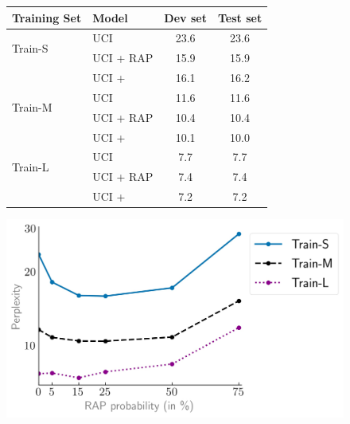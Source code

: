 

\begin{figure}
	\begin{minipage}{\textwidth}
		\begin{minipage}[b]{0.48\textwidth}
			\centering
			\begin{tabular}{llcc}
				\toprule
				Training Set & Model   & Dev set & Test set \\
				\midrule
				\multirow{2}{*}{Train-S} 
				& UCI 				& 23.6 & 23.6\\
				& UCI + RAP 		& 15.9 & 15.9\\
				& UCI + \piecetype 	& 16.1 & 16.2 \\
				\midrule
				\multirow{2}{*}{Train-M} 
				& UCI 				& 11.6 & 11.6\\
				& UCI + RAP 		& 10.4 & 10.4\\
				& UCI + \piecetype 	& 10.1 & 10.0 \\
				\midrule
				\multirow{2}{*}{Train-L} 
				& UCI 				& \phantom{1}7.7 & \phantom{1}7.7\\
				& UCI + RAP 		& \phantom{1}7.4 & \phantom{1}7.4\\
				& UCI + \piecetype 	& \phantom{1}7.2 & \phantom{1}7.2 \\
				\bottomrule
				
			\end{tabular}
			\label{tab:perplexity}
		\end{minipage}
		\hfill
		\begin{minipage}[b]{0.48\textwidth}
			\centering
			\includegraphics[width=\textwidth]{figures/rap_effect.jpg}
			\label{fig:rap_vals}
		\end{minipage}
	\end{minipage}
\end{figure}